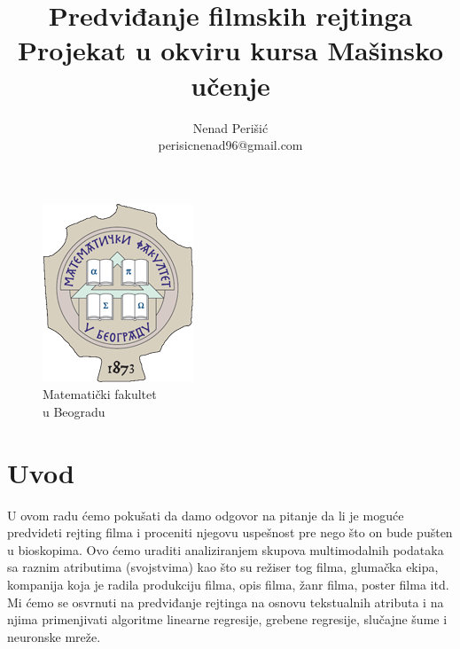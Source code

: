 \documentclass[a4paper]{article}
\begin{document}
\title{\textbf{Predviđanje filmskih rejtinga}\\
\small{Projekat u okviru kursa Mašinsko učenje}}

\author{Nenad Perišić\\perisicnenad96@gmail.com\\}

\medskip

\newpage

\maketitle


\vspace{2cm}
\begin{figure}[b!]
\begin{center}
\includegraphics[scale=0.67]{matf_logo.png} \\
\small{Matematički fakultet \\ u Beogradu}
\end{center}
\end{figure}


\pagebreak

\tableofcontents

\newpage

\section{Uvod}
\label{sec:uvod}
U ovom radu ćemo pokušati da damo odgovor na pitanje da li je moguće predvideti rejting filma i proceniti njegovu uspešnost pre nego što on bude pušten u bioskopima. Ovo ćemo uraditi analiziranjem skupova multimodalnih podataka sa raznim atributima (svojstvima) kao što su režiser tog filma, glumačka ekipa, kompanija koja je radila produkciju filma, opis filma, žanr filma, poster filma itd. Mi ćemo se osvrnuti na predviđanje rejtinga na osnovu tekstualnih atributa i na njima primenjivati algoritme linearne regresije, grebene regresije, slučajne šume i neuronske mreže.
\end{document}
